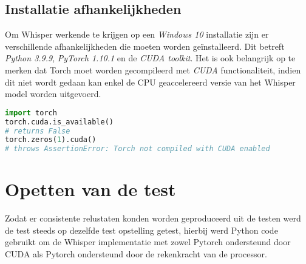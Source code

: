\bigbreak{}

\subsection*{Installatie afhankelijkheden}

Om Whisper werkende te krijgen op een \textit{Windows 10} installatie zijn er verschillende afhankelijkheden die moeten worden geïnstalleerd. Dit betreft \textit{Python 3.9.9}, \textit{PyTorch 1.10.1} en de \textit{CUDA toolkit}. Het is ook belangrijk op te merken dat Torch moet worden gecompileerd met \textit{CUDA} functionaliteit, indien dit niet wordt gedaan kan enkel de CPU geaccelereerd versie van het Whisper model worden uitgevoerd.

\bigbreak{}


\begin{lstlisting}[language=python]
import torch
torch.cuda.is_available()
# returns False
torch.zeros(1).cuda()
# throws AssertionError: Torch not compiled with CUDA enabled
\end{lstlisting}





\section*{Opetten van de test}

Zodat er consistente relustaten konden worden geproduceerd uit de testen werd de test steeds op dezelfde test opstelling getest, hierbij werd Python code gebruikt om de Whisper implementatie met zowel Pytorch ondersteund door CUDA als Pytorch ondersteund door de rekenkracht van de processor.

